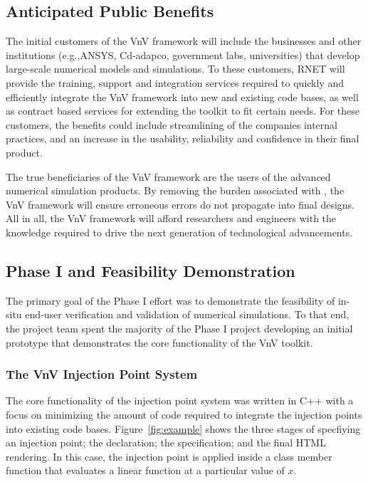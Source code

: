 \subsection{Anticipated Public Benefits}

The initial customers of the VnV framework will include the businesses and other institutions (e.g.,ANSYS, Cd-adapco, government labs, universities) that develop large-scale numerical models and simulations. To these customers, RNET will provide the training, support and integration services required to quickly and efficiently integrate the VnV framework into new and existing code bases, as well as contract based services for extending the toolkit to fit certain needs. For these customers, the benefits could include streamlining of the companies internal \VV practices, and an increase in the usability, reliability and confidence in their final product.

The true beneficiaries of the VnV framework are the users of the advanced numerical simulation products. By removing the burden associated with \VV, the VnV framework will ensure erroneous errors do not propagate into final designs. All in all, the VnV framework will afford researchers and engineers with the knowledge required to drive the next generation of technological advancements. 

\subsection{Phase I and Feasibility Demonstration}

The primary goal of the Phase I effort was to demonstrate the feasibility of in-situ end-user 
verification and validation of numerical simulations. To that end, the project team spent the majority of the Phase I
project developing an initial prototype that demonstrates the core functionality of the VnV toolkit.

\subsubsection{The VnV Injection Point System}

The core functionality of the injection point system was written in C++ with a focus on minimizing the amount of 
code required to integrate the injection points into existing code bases. Figure~\ref{fig:example} shows the three stages of specfiying an injection point; the declaration; the specification; and the final HTML rendering. In this case, the injection point is applied inside a class member function that evaluates a linear function at a particular value of $x$.

